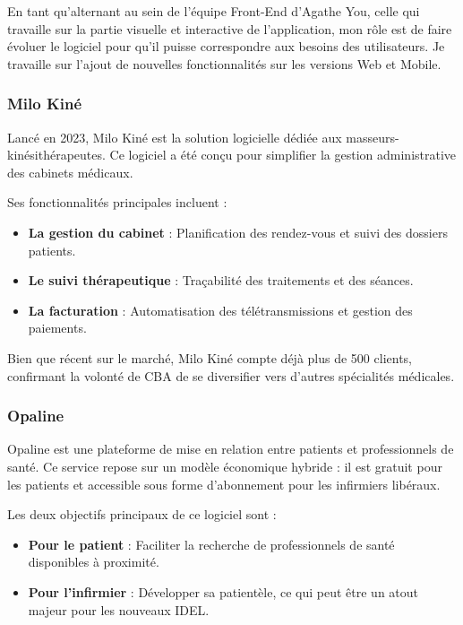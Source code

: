 \documentclass{article}
\begin{document}
En tant qu'alternant au sein de l'équipe Front-End d'Agathe You, celle qui travaille sur la partie visuelle et interactive de l'application, mon rôle est de faire évoluer le logiciel pour qu'il puisse correspondre aux besoins des utilisateurs. Je travaille sur l'ajout de nouvelles fonctionnalités sur les versions Web et Mobile.

\subsubsection{Milo Kiné}

Lancé en 2023, Milo Kiné est la solution logicielle dédiée aux masseurs-kinésithérapeutes. Ce logiciel a été conçu pour simplifier la gestion administrative des cabinets médicaux.

Ses fonctionnalités principales incluent :

\begin{itemize}
    \item \textbf{La gestion du cabinet} : Planification des rendez-vous et suivi des dossiers patients.
    \item \textbf{Le suivi thérapeutique} : Traçabilité des traitements et des séances.
    \item \textbf{La facturation} : Automatisation des télétransmissions et gestion des paiements.
\end{itemize}

Bien que récent sur le marché, Milo Kiné compte déjà plus de 500 clients, confirmant la volonté de CBA de se diversifier vers d'autres spécialités médicales.

\subsubsection{Opaline}

Opaline est une plateforme de mise en relation entre patients et professionnels de santé. Ce service repose sur un modèle économique hybride : il est gratuit pour les patients et accessible sous forme d'abonnement pour les infirmiers libéraux.

Les deux objectifs principaux de ce logiciel sont :

\begin{itemize}
    \item \textbf{Pour le patient} : Faciliter la recherche de professionnels de santé disponibles à proximité.
    \item \textbf{Pour l'infirmier} : Développer sa patientèle, ce qui peut être un atout majeur pour les nouveaux IDEL.
\end{itemize}
\end{document}
